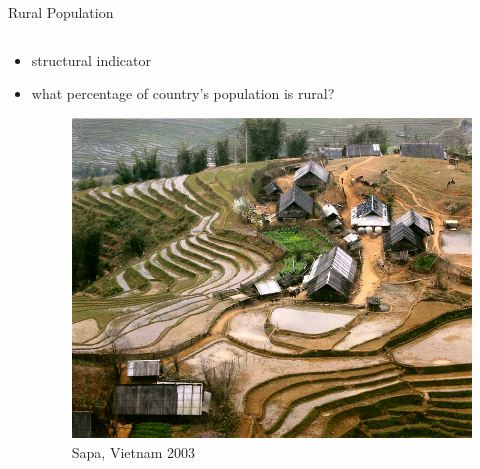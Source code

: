 \documentclass{beamer}
\begin{document}
\begin{frame}{Rural Population}
\begin{columns}
  \begin{column}{0.5\textwidth}
     \begin{itemize}
        \item structural indicator
        \item what percentage of country's population is rural?
        \begin{figure}
	\centering
	\includegraphics[scale=0.15]{images/sapa_vietnam_2003.jpg}
	\caption{Sapa, Vietnam 2003}
	\end{figure}
     \end{itemize}
  \end{column}
\end{columns}

\end{frame}

\end{document}
